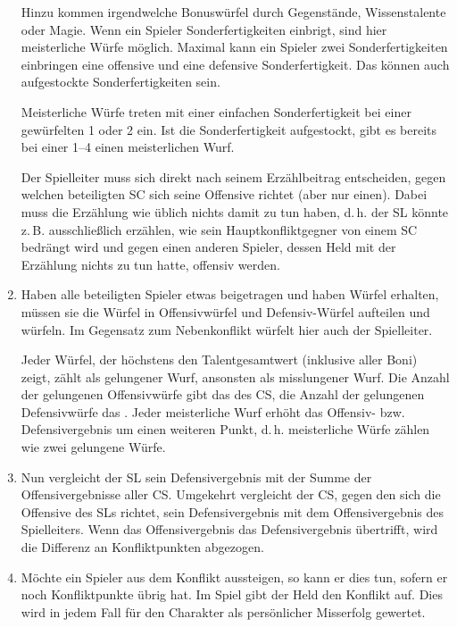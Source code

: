 \begin{enumerate}
  Hinzu kommen irgendwelche Bonuswürfel durch Gegenstände, Wissenstalente oder Magie.
Wenn ein Spieler Sonderfertigkeiten einbrigt, sind hier meisterliche Würfe möglich. Maximal kann ein Spieler zwei Sonderfertigkeiten einbringen eine offensive und eine defensive Sonderfertigkeit. Das können auch aufgestockte Sonderfertigkeiten sein.

  Meisterliche Würfe treten mit einer einfachen Sonderfertigkeit bei einer gewürfelten 1 oder 2 ein. Ist die Sonderfertigkeit aufgestockt, gibt es bereits bei einer 1--4 einen meisterlichen Wurf.
  
  Der Spielleiter muss sich direkt nach seinem Erzählbeitrag entscheiden, gegen welchen beteiligten SC sich seine Offensive richtet (aber nur einen). Dabei muss die Erzählung wie üblich nichts damit zu tun haben, d.\,h. der SL könnte z.\,B. ausschließlich erzählen, wie sein Hauptkonfliktgegner von einem SC bedrängt wird und gegen einen anderen Spieler, dessen Held mit der Erzählung nichts zu tun hatte, offensiv werden.

  \item Haben alle beteiligten Spieler etwas beigetragen und haben Würfel erhalten, müssen sie die Würfel in Offensivwürfel und Defensiv-Würfel aufteilen und würfeln. Im Gegensatz zum Nebenkonflikt würfelt hier auch der Spielleiter.
  
  Jeder Würfel, der höchstens den Talentgesamtwert (inklusive aller Boni) zeigt, zählt als gelungener Wurf, ansonsten als misslungener Wurf.
  Die Anzahl der gelungenen Offensivwürfe gibt das  des CS, die Anzahl der gelungenen Defensivwürfe das . Jeder meisterliche Wurf erhöht das Offensiv- bzw. Defensivergebnis um einen weiteren Punkt, d.\,h. meisterliche Würfe zählen wie zwei gelungene Würfe.

  \item Nun vergleicht der SL sein Defensivergebnis mit der Summe der Offensivergebnisse aller CS. Umgekehrt vergleicht der CS, gegen den sich die Offensive des SLs richtet, sein Defensivergebnis mit dem Offensivergebnis des Spielleiters. Wenn das Offensivergebnis das Defensivergebnis übertrifft, wird die Differenz an Konfliktpunkten abgezogen.

  \item Möchte ein Spieler aus dem Konflikt aussteigen, so kann er dies tun, sofern er noch Konfliktpunkte übrig hat. Im Spiel gibt der Held den Konflikt auf. Dies wird in jedem Fall für den Charakter als persönlicher Misserfolg gewertet.


\end{enumerate}
